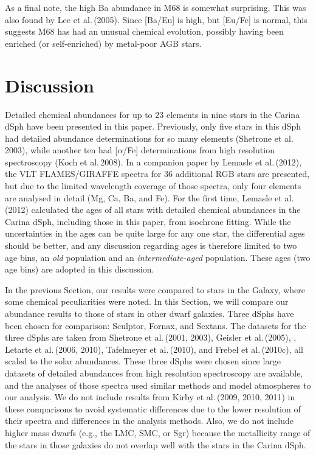 \documentclass{emulateapj}
\newcommand\etal{{\rm et al.\,}}
\begin{document}
As a final note, the high Ba abundance in M68 is somewhat surprising.
This was also found by Lee \etal (2005).  Since [Ba/Eu] 
is high, but [Eu/Fe] is normal, 
this suggests M68 has had an unusual chemical evolution,
possibly having been enriched (or self-enriched) by metal-poor 
AGB stars. 







\section{Discussion}

Detailed chemical abundances for up to 23 elements in nine stars 
in the Carina dSph have been presented in this paper.   Previously,
only five stars in this dSph had detailed abundance determinations
for so many elements (Shetrone \etal 2003), while another ten had
[$\alpha$/Fe] determinations from high resolution spectroscopy
(Koch \etal 2008).
%
In a companion paper by Lemasle \etal (2012), the VLT FLAMES/GIRAFFE 
spectra for 36 additional RGB stars are presented, but due to the 
limited wavelength coverage of those spectra, only four elements 
are analysed in detail (Mg, Ca, Ba, and Fe).
%
For the first time, Lemasle \etal (2012) calculated the ages of all 
stars with detailed chemical abundances in the Carina dSph, including
those in this paper, from isochrone fitting.   While the uncertainties 
in the ages can be quite large for any one star, the differential ages
should be better, and any discussion regarding ages is therefore 
limited to two
age bins, an {\it old} population and an {\it intermediate-aged} 
population.  These ages (two age bins) are adopted in this discussion.

In the previous Section, our results were compared to stars in the 
Galaxy, where some chemical peculiarities were noted.   In this 
Section, we will compare our abundance results to those of stars 
in other dwarf galaxies. 
Three dSphs have been chosen for comparison: Sculptor, Fornax, and Sextans.
The datasets for the three dSphs are taken from Shetrone \etal (2001, 2003), 
Geisler \etal (2005), \citet{Aoki09}, Letarte \etal (2006, 2010), 
Tafelmeyer \etal (2010), and Frebel \etal (2010c),
all scaled to the \citet{Asp09} solar abundances.
These three dSphs were chosen since large datasets of detailed abundances 
from high resolution spectroscopy are available, and the analyses of
those spectra used similar methods and model atmospheres to our analysis.
%
We do not include results from Kirby \etal (2009, 2010, 2011) in 
these comparisons to avoid systematic differences due to the lower 
resolution of their spectra and differences in the analysis methods.
%
Also, we do not include higher mass dwarfs (e.g., the LMC, SMC, or Sgr) 
because the metallicity range of the stars in those galaxies do not 
overlap well with the stars in the Carina dSph.  
\end{document}
